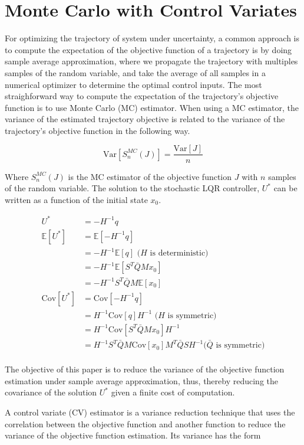 \documentclass{article}
\begin{document}
\section{Monte Carlo with Control Variates}

For optimizing the trajectory of system under uncertainty, a common approach is to compute the expectation of the objective
function of a trajectory is by doing sample average approximation, where we propagate the trajectory with multiples samples
of the random variable, and take the average of all samples in a numerical optimizer to determine the optimal control inputs.
The most straighforward way to compute the expectation of the trajectory's objective function is to use Monte Carlo (MC) estimator.
When using a MC estimator, the variance of the estimated trajectory objective is related to the variance of the trajectory's
objective function in the following way.

$$
\text{Var}[S_n^{MC}(J)] = \frac{\text{Var}[J]}{n}
$$

Where $S_n^{MC}(J)$ is the MC estimator of the objective function $J$ with $n$ samples of the random variable.
The solution to the stochastic LQR controller, $U^*$ can be written as a function of the initial state $x_0$.

$$
\begin{aligned}
  U^* &= -H^{-1} q \\
  \mathbb{E}[U^*] &= \mathbb{E}[-H^{-1} q] \\
  &= -H^{-1} \mathbb{E}[q] \text{ ($H$ is deterministic)} \\
  &= -H^{-1} \mathbb{E}[S^T \bar{Q} M x_0] \\
  &= -H^{-1} S^T \bar{Q} M \mathbb{E}[x_0] \\
  \text{Cov}[U^*] &= \text{Cov}[-H^{-1} q] \\
  &= H^{-1} \text{Cov}[q] H^{-1} \text{ ($H$ is symmetric)} \\
  &= H^{-1} \text{Cov}[S^T \bar{Q} M x_0] H^{-1} \\
  &= H^{-1} S^T \bar{Q} M \text{Cov}[x_0] M^T \bar{Q} S H^{-1} \text{($\bar{Q}$ is symmetric)} \\
\end{aligned}
$$

The objective of this paper is to reduce the variance of the objective function estimation under sample average approximation,
thus, thereby reducing the covariance of the solution $U^*$ given a finite cost of computation.

A control variate (CV) estimator is a variance reduction technique that uses the correlation between the objective function
and another function to reduce the variance of the objective function estimation. Its variance has the form
\end{document}
